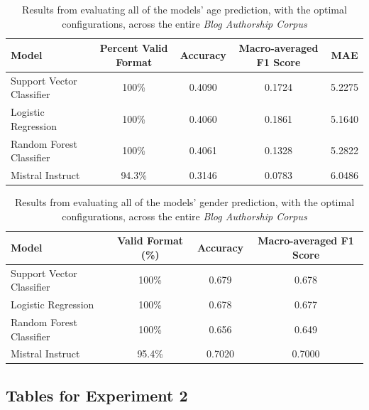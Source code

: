 \documentclass{report}
\begin{document}
\vspace{5em}

\begin{table}[H]
\centering
\begin{tabular}{lcccc}
\toprule
Model & Percent Valid Format & Accuracy & Macro-averaged F1 Score & MAE \\
\midrule
Support Vector Classifier & 100\% & 0.4090 & 0.1724 & 5.2275 \\
Logistic Regression & 100\% & 0.4060 & 0.1861 & 5.1640 \\
Random Forest Classifier & 100\% & 0.4061 & 0.1328 & 5.2822 \\
Mistral Instruct & 94.3\% & 0.3146 & 0.0783 & 6.0486 \\
\bottomrule
\end{tabular}
\caption{Results from evaluating all of the models' age prediction, with the optimal configurations, across the entire \textit{Blog Authorship Corpus}}
\label{tab:full-shallow-age-prediction}
\end{table}

\vspace{5em}

\begin{table}[H]
\centering
\begin{tabular}{lccc}
\toprule
Model & Valid Format (\%) & Accuracy & Macro-averaged F1 Score \\
\midrule
Support Vector Classifier & 100\% & 0.679 & 0.678 \\
Logistic Regression & 100\% & 0.678 & 0.677 \\
Random Forest Classifier & 100\% & 0.656 & 0.649 \\
Mistral Instruct & 95.4\% & 0.7020 & 0.7000 \\
\bottomrule
\end{tabular}
\caption{Results from evaluating all of the models' gender prediction, with the optimal configurations, across the entire \textit{Blog Authorship Corpus}}
\label{tab:full-shallow-gender-prediction}
\end{table}


\subsection{Tables for Experiment 2}
\end{document}
